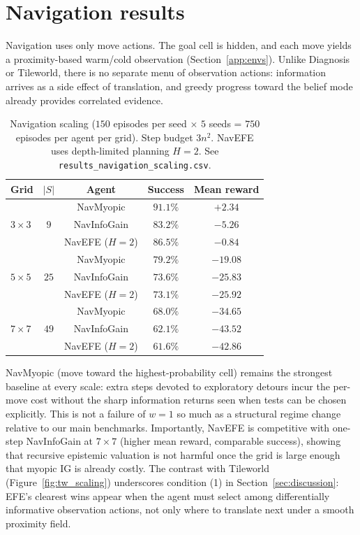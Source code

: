 \documentclass[runningheads]{llncs}
\begin{document}
\section{Navigation results}
\label{app:navigation}

Navigation uses only move actions. The goal cell is hidden, and each move yields a proximity-based warm/cold observation (Section~\ref{app:envs}). Unlike Diagnosis or Tileworld, there is no separate menu of observation actions: information arrives as a side effect of translation, and greedy progress toward the belief mode already provides correlated evidence.

\begin{table}[h]
\centering
\caption{Navigation scaling ($150$ episodes per seed $\times$ $5$ seeds = $750$ episodes per agent per grid). Step budget $3n^2$. NavEFE uses depth-limited planning $H{=}2$. See \texttt{results\_navigation\_scaling.csv}.}
\label{tab:nav_scaling}
\begin{small}
\begin{tabular}{lcccc}
\toprule
Grid & $|S|$ & Agent & Success & Mean reward \\
\midrule
\multirow{3}{*}{$3{\times}3$} & \multirow{3}{*}{$9$} & NavMyopic & $91.1\%$ & $+2.34$ \\
& & NavInfoGain & $83.2\%$ & $-5.26$ \\
& & NavEFE ($H{=}2$) & $86.5\%$ & $-0.84$ \\
\midrule
\multirow{3}{*}{$5{\times}5$} & \multirow{3}{*}{$25$} & NavMyopic & $79.2\%$ & $-19.08$ \\
& & NavInfoGain & $73.6\%$ & $-25.83$ \\
& & NavEFE ($H{=}2$) & $73.1\%$ & $-25.92$ \\
\midrule
\multirow{3}{*}{$7{\times}7$} & \multirow{3}{*}{$49$} & NavMyopic & $68.0\%$ & $-34.65$ \\
& & NavInfoGain & $62.1\%$ & $-43.52$ \\
& & NavEFE ($H{=}2$) & $61.6\%$ & $-42.86$ \\
\bottomrule
\end{tabular}
\end{small}
\end{table}

NavMyopic (move toward the highest-probability cell) remains the strongest baseline at every scale: extra steps devoted to exploratory detours incur the per-move cost without the sharp information returns seen when tests can be chosen explicitly. This is not a failure of $w{=}1$ so much as a structural regime change relative to our main benchmarks. Importantly, NavEFE is competitive with one-step NavInfoGain at $7{\times}7$ (higher mean reward, comparable success), showing that recursive epistemic valuation is not harmful once the grid is large enough that myopic IG is already costly. The contrast with Tileworld (Figure~\ref{fig:tw_scaling}) underscores condition (1) in Section~\ref{sec:discussion}: EFE's clearest wins appear when the agent must select among differentially informative observation actions, not only where to translate next under a smooth proximity field.
\end{document}
